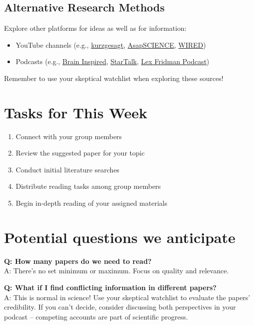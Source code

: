 \documentclass[
  letterpaper,
  DIV=11,
  numbers=noendperiod]{scrreprt}
\providecommand{\tightlist}{%
  \setlength{\itemsep}{0pt}\setlength{\parskip}{0pt}}\usepackage{longtable,booktabs,array}
\begin{document}
\subsection{Alternative Research
Methods}\label{alternative-research-methods}

Explore other platforms for ideas as well as for information:

\begin{itemize}
\item
  YouTube channels (e.g.,
  \href{https://www.youtube.com/@kurzgesagt}{kurzgesagt},
  \href{https://www.youtube.com/@AsapSCIENCE}{AsapSCIENCE},
  \href{https://www.youtube.com/@WIRED}{WIRED})
\item
  Podcasts (e.g., \href{https://braininspired.co/}{Brain Inspired},
  \href{https://startalkmedia.com/}{StarTalk},
  \href{https://lexfridman.com/podcast/}{Lex Fridman Podcast})
\end{itemize}

Remember to use your skeptical watchlist when exploring these sources!

\section{Tasks for This Week}\label{tasks-for-this-week}

\begin{enumerate}
\def\labelenumi{\arabic{enumi}.}
\tightlist
\item
  Connect with your group members
\item
  Review the suggested paper for your topic
\item
  Conduct initial literature searches
\item
  Distribute reading tasks among group members
\item
  Begin in-depth reading of your assigned materials
\end{enumerate}

\section{Potential questions we
anticipate}\label{potential-questions-we-anticipate}

\textbf{Q: How many papers do we need to read?}\\
A: There's no set minimum or maximum. Focus on quality and relevance.

\textbf{Q: What if I find conflicting information in different
papers?}\\
A: This is normal in science! Use your skeptical watchlist to evaluate
the papers' credibility. If you can't decide, consider discussing both
perspectives in your podcast -- competing accounts are part of
scientific progress.
\end{document}
